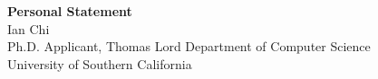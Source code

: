 \documentclass[11pt]{article}
\begin{document}
\begin{center}
    {\Large \textbf{Personal Statement}}\\[4pt]
    {\large Ian Chi}\\[2pt]
    Ph.D. Applicant, Thomas Lord Department of Computer Science\\
    University of Southern California
\end{center}

\vspace{1em}

\end{document}
